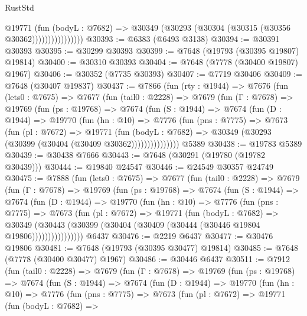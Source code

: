 \begin{lexlean}{RustStd}
\begin{coremodule}
{\begin{coremodule}
{{{{{{{{{{{{{{{{{{{{{{{{{{{{{{{{{{{{{{{{{{{{{{{{{{{{{                        @19771
                          (fun (bodyL : @7682) =>
                          @30349 (@30293 (@30304 (@30315 (@30356 @30362))))))))))))))))
@30393 := @6383 (@6493 @3138)
@30394 := @30391 @30393
@30395 := @30299 @30393
@30399 := @7648 (@19793 (@30395 @19807) @19814)
@30400 := @30310 @30393
@30404 := @7648 (@7778 (@30400 @19807) @1967)
@30406 := @30352 (@7735 @30393)
@30407 := @7719 @30406
@30409 := @7648 (@30407 @19837)
@30437 := @7866
    (fun (rty : @1944) =>
    @7676
      (fun (lets0 : @7675) =>
      @7677
        (fun (tail0 : @2228) =>
        @7679
          (fun (Γ : @7678) =>
          @19769
            (fun (ps : @19768) =>
            @7674
              (fun (S : @1944) =>
              @7674
                (fun (D : @1944) =>
                @19770
                  (fun (hn : @10) =>
                  @7776
                    (fun (pns : @7775) =>
                    @7673
                      (fun (pl : @7672) =>
                      @19771
                        (fun (bodyL : @7682) =>
                        @30349 (@30293 (@30399 (@30404 (@30409 @30362)))))))))))))))
    @5389
@30438 := @19783 @5389
@30439 := @30438 @7666
@30443 := @7648 (@30291 (@19780 (@19782 @30439)))
@30444 := @19840 @24547
@30446 := @24549 @30357 @24749
@30475 := @7888
    (fun (lets0 : @7675) =>
    @7677
      (fun (tail0 : @2228) =>
      @7679
        (fun (Γ : @7678) =>
        @19769
          (fun (ps : @19768) =>
          @7674
            (fun (S : @1944) =>
            @7674
              (fun (D : @1944) =>
              @19770
                (fun (hn : @10) =>
                @7776
                  (fun (pns : @7775) =>
                  @7673
                    (fun (pl : @7672) =>
                    @19771
                      (fun (bodyL : @7682) =>
                      @30349
                        (@30443
                          (@30399 (@30404 (@30409 (@30444 (@30446 @19804 @19806))))))))))))))))
    @6437
@30476 := @2219 @6437
@30477 := @30476 @19806
@30481 := @7648 (@19793 (@30395 @30477) @19814)
@30485 := @7648 (@7778 (@30400 @30477) @1967)
@30486 := @30446 @6437
@30511 := @7912
    (fun (tail0 : @2228) =>
    @7679
      (fun (Γ : @7678) =>
      @19769
        (fun (ps : @19768) =>
        @7674
          (fun (S : @1944) =>
          @7674
            (fun (D : @1944) =>
            @19770
              (fun (hn : @10) =>
              @7776
                (fun (pns : @7775) =>
                @7673
                  (fun (pl : @7672) =>
                  @19771
                    (fun (bodyL : @7682) =>
}}}}}}}}}}}}}}}}}}}}}}}}}}}}}}}}}}}}}}}}}}}}}}}}}}}}}
\end{coremodule}}
\end{coremodule}
\end{lexlean}
